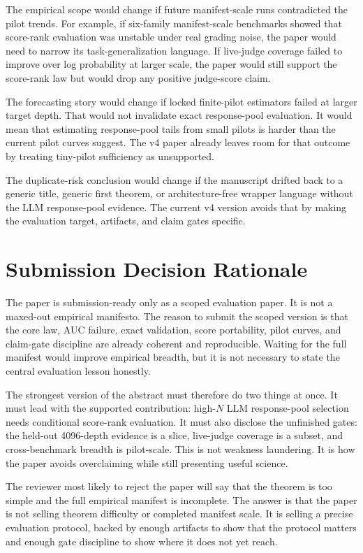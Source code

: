 The empirical scope would change if future manifest-scale runs contradicted
the pilot trends. For example, if six-family manifest-scale benchmarks showed
that score-rank evaluation was unstable under real grading noise, the paper
would need to narrow its task-generalization language. If live-judge coverage
failed to improve over log probability at larger scale, the paper would still
support the score-rank law but would drop any positive judge-score claim.

The forecasting story would change if locked finite-pilot estimators failed at
larger target depth. That would not invalidate exact response-pool evaluation.
It would mean that estimating response-pool tails from small pilots is harder
than the current pilot curves suggest. The v4 paper already leaves room for
that outcome by treating tiny-pilot sufficiency as unsupported.

The duplicate-risk conclusion would change if the manuscript drifted back to a
generic title, generic first theorem, or architecture-free wrapper language
without the LLM response-pool evidence. The current v4 version avoids that by
making the evaluation target, artifacts, and claim gates specific.

\section{Submission Decision Rationale}
\label{app:submission-rationale}

The paper is submission-ready only as a scoped evaluation paper. It is not a
maxed-out empirical manifesto. The reason to submit the scoped version is that
the core law, AUC failure, exact validation, score portability, pilot curves,
and claim-gate discipline are already coherent and reproducible. Waiting for
the full manifest would improve empirical breadth, but it is not necessary to
state the central evaluation lesson honestly.

The strongest version of the abstract must therefore do two things at once. It
must lead with the supported contribution: high-$N$ LLM response-pool
selection needs conditional score-rank evaluation. It must also disclose the
unfinished gates: the held-out 4096-depth evidence is a slice, live-judge
coverage is a subset, and cross-benchmark breadth is pilot-scale. This is not
weakness laundering. It is how the paper avoids overclaiming while still
presenting useful science.

The reviewer most likely to reject the paper will say that the theorem is too
simple and the full empirical manifest is incomplete. The answer is that the
paper is not selling theorem difficulty or completed manifest scale. It is
selling a precise evaluation protocol, backed by enough artifacts to show that
the protocol matters and enough gate discipline to show where it does not yet
reach.

